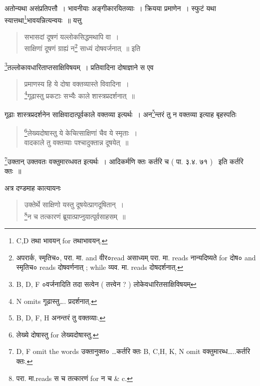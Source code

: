 \documentclass[11pt, openany]{book}
\begin{document}
अतोन्यथा असंप्रतिपत्तौ~। भावनीयाः अङ्गीकारयितव्याः~। क्रियया प्रमाणेन~। स्फुटं यथा स्यात्तथा\renewcommand{\thefootnote}{5}\footnote{C,D तथा भावयन् for तथाभावयन्.}भावयन्नित्यन्वयः~॥ यत्तु

\begin{quote}
{\vy सभासदां दूषणं यल्लोकसिद्धमथापि वा~।\\
साक्षिणां दूषणं ग्राह्यं न\renewcommand{\thefootnote}{6}\footnote{अपरार्क, स्मृतिच०, परा. मा. and वीर०read असाध्यम् परा. मा. reads नान्यदिष्यते for दोष० and स्मृतिच० reads दोषवर्णनात् ; while व्यव. मा. reads दोषदर्शनात्.} साध्यं दोषवर्जनात्~॥} इति
\end{quote}

\newpage
{}

\renewcommand{\thefootnote}{1}\footnote{B, D, F ०वर्जनादिति तदा सत्वेन ( तत्त्वेन ? ) लोकेवधारितसाक्षिविषयम्}तल्लोकावधारिताप्तसाक्षिविषयम्~। प्रतिवादिना दोषाज्ञाने स एव

\begin{quote}
{\vy प्रमाणस्य हि ये दोषा वक्तव्यास्ते विवादिना~।\\
\renewcommand{\thefootnote}{2}\footnote{N omits गूढास्तु\ldots. प्रदर्शनात्.}गूढास्तु प्रकटाः सभ्यैः काले शास्त्रप्रदर्शनात्~॥}
\end{quote}

गूढाः शास्त्रप्रदर्शनेन साक्षिवादात्पूर्वकाले वक्तव्या इत्यर्थः~। अन\renewcommand{\thefootnote}{3}\footnote{B, D, F, H अनन्तरं तु वक्तव्याः.}न्तरं तु न वक्तव्या इत्याह बृहस्पतिः

\begin{quote}
{\vy \renewcommand{\thefootnote}{4}\footnote{लेख्ये दोषास्तु for लेख्यदोषास्तु.}लेख्यदोषास्तु ये केचित्साक्षिणां चैव ये स्मृताः~।\\
वादकाले तु वक्तव्याः पश्चादुक्तान्न दूषयेत्~॥}
\end{quote}

\renewcommand{\thefootnote}{5}\footnote{D, F omit the words उक्तानुक्त० \ldots कर्तरि क्तः B, C,H, K, N omit वक्तुमारब्ध\ldots..कर्तरि क्तः.}उक्तान् उक्तवतः वक्तुमारव्धवत इत्यर्थः~। आदिकर्मणि क्तः कर्तरि च ( पा. ३.४. ७१ ) \textendash\ इति कर्तरि क्तः~॥

अत्र दण्डमाह कात्यायनः

\begin{quote}
{\vy उक्तेर्थे साक्षिणो यस्तु दूषयेत्प्रागदूषितान्~।\\
\renewcommand{\thefootnote}{6}\footnote{परा. मा.reads स च तत्कारणं for न च \& c.}न च तत्कारणं ब्रूयात्प्राप्नुयात्पूर्वसाहसम्~॥}
\end{quote}
\end{document}
